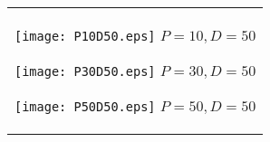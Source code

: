 \documentclass[a4paper,11pt,oneside,openany]{jsbook}
\begin{document}
\begin{figure}[htbp]
  \begin{center}
    \begin{tabular}{c}


      \begin{minipage}{0.33\hsize}
        \begin{center}
          \texttt{[image: P10D50.eps]}
          \hspace{1.2cm} $P=10, D=50
$        \end{center}
      \end{minipage}

      \begin{minipage}{0.33\hsize}
        \begin{center}
          \texttt{[image: P30D50.eps]}
          \hspace{1.2cm} $P=30, D=50
$        \end{center}
      \end{minipage}

      \begin{minipage}{0.33\hsize}
        \begin{center}
          \texttt{[image: P50D50.eps]}
          \hspace{1.2cm} $P=50, D=50
$        \end{center}
      \end{minipage}
    \end{tabular}
  \end{center}
\end{figure}
\end{document}

